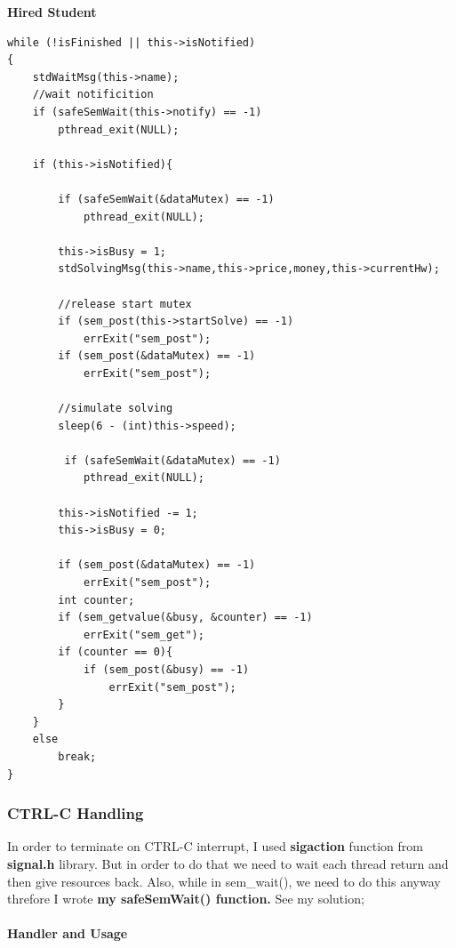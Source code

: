 \documentclass{article}
\begin{document}
\cleardoublepage
\textbf{Hired Student}
\begin{lstlisting}[style=CStyle]
while (!isFinished || this->isNotified)
{
	stdWaitMsg(this->name);
	//wait notificition
	if (safeSemWait(this->notify) == -1)
    	pthread_exit(NULL);
		
	if (this->isNotified){
	
		if (safeSemWait(&dataMutex) == -1)
        	pthread_exit(NULL);
        	
		this->isBusy = 1;
		stdSolvingMsg(this->name,this->price,money,this->currentHw);
		
		//release start mutex
		if (sem_post(this->startSolve) == -1)
			errExit("sem_post");
		if (sem_post(&dataMutex) == -1)
			errExit("sem_post");

		//simulate solving
		sleep(6 - (int)this->speed);

		 if (safeSemWait(&dataMutex) == -1)
         	pthread_exit(NULL);
			
		this->isNotified -= 1;
		this->isBusy = 0;

		if (sem_post(&dataMutex) == -1)
			errExit("sem_post");
		int counter;
		if (sem_getvalue(&busy, &counter) == -1)
			errExit("sem_get");
		if (counter == 0){
			if (sem_post(&busy) == -1)
				errExit("sem_post");
		}
	}
	else
		break;
}
\end{lstlisting}
\subsubsection{CTRL-C Handling}
In order to terminate on CTRL-C interrupt, I used \textbf{sigaction} function from \textbf{signal.h} library. But in order to do that we need to wait
each thread return and then give resources back. Also, while in sem\_wait(), we need to do this anyway threfore I wrote \textbf{my safeSemWait() function.}
See my solution; \\ \\
\textbf{Handler and Usage}
\cleardoublepage
\end{document}
